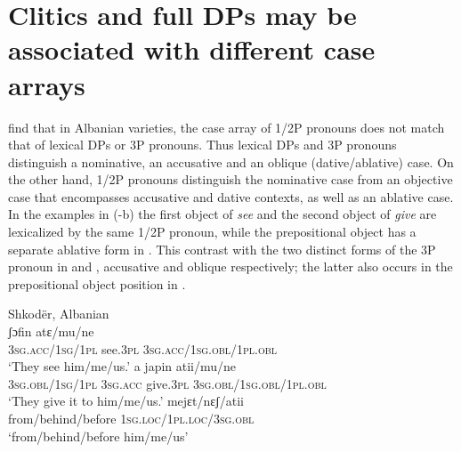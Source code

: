 \documentclass[output=paper,colorlinks,citecolor=brown]{./langscibook}
\begin{document}
\section{Clitics and full DPs may be associated with different case arrays}\label{sec:manzini:2}

\citet{ManziniSavoia2014} find that in Albanian varieties, the case array of 1/2P pronouns does not match that of lexical DPs or 3P pronouns. Thus lexical DPs and 3P pronouns distinguish a nominative, an accusative and an oblique (dative/ablative) case. On the other hand, 1/2P pronouns distinguish the nominative case from an objective case that encompasses accusative and dative contexts, as well as an ablative case. In the examples in (-b) the first object of \textit{see} and the second object of \textit{give} are lexicalized by the same 1/2P pronoun, while the prepositional object has a separate ablative form in . This contrast with the two distinct forms of the 3P pronoun in  and , accusative and oblique respectively; the latter also occurs in the prepositional object position in .  

\ea%
    \label{ex:manzini:10}
    Shkodër, Albanian \citep{ManziniSavoia2014}\\
    \ea\label{ex:manzini:10a} 
          {ʃɔfin}    {atɛ/mu/ne}\\
        \textsc{3sg.acc/1sg/1pl}    see.\textsc{3pl} \textsc{3sg.acc/1sg.obl/1pl.obl}\\
    \glt ‘They see him/me/us.’
    \ex\label{ex:manzini:10b} 
           {a}   {japin}    {atii/mu/ne}\\
        \textsc{3sg.obl/1sg/1pl} \textsc{3sg.acc} give.\textsc{3pl}  \textsc{3sg.obl/1sg.obl/1pl.obl}\\
    \glt ‘They give it to him/me/us.’
    \ex\label{ex:manzini:10c} 
         {mejɛt/nɛʃ/atii}\\
        from/behind/before \textsc{1sg.loc/1pl.loc/3sg.obl}\\
    \glt ‘from/behind/before him/me/us’
    \z
\z
\end{document}
